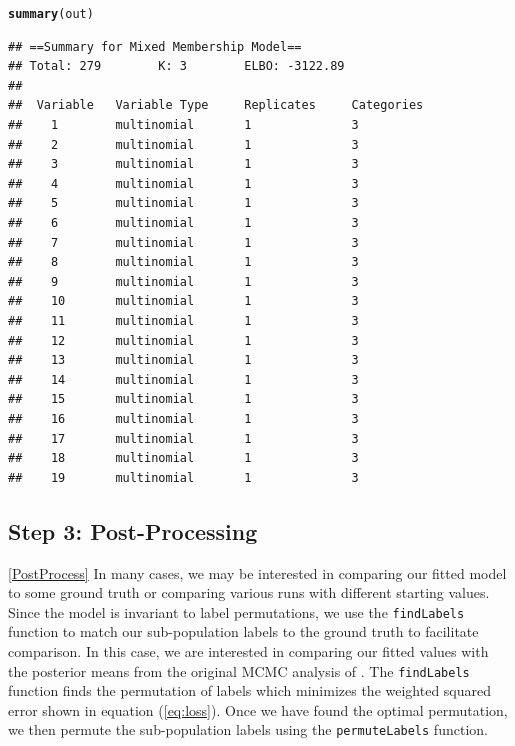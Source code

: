 \documentclass{article}\usepackage[]{graphicx}\usepackage[]{color}
\makeatletter
\newcommand{\hlstd}[1]{\textcolor[rgb]{0.345,0.345,0.345}{#1}}%
\newcommand{\hlkwd}[1]{\textcolor[rgb]{0.737,0.353,0.396}{\textbf{#1}}}%
\newenvironment{kframe}{%
 \def\at@end@of@kframe{}%
 \ifinner\ifhmode%
  \def\at@end@of@kframe{\end{minipage}}%
  \begin{minipage}{\columnwidth}%
 \fi\fi%
 \def\FrameCommand##1{\hskip\@totalleftmargin \hskip-\fboxsep
 \colorbox{shadecolor}{##1}\hskip-\fboxsep
     \hskip-\linewidth \hskip-\@totalleftmargin \hskip\columnwidth}%
 \MakeFramed {\advance\hsize-\width
   \@totalleftmargin\z@ \linewidth\hsize
   \@setminipage}}%
 {\par\unskip\endMakeFramed%
 \at@end@of@kframe}
\newenvironment{knitrout}{}{} %
\renewenvironment{knitrout}{\begin{singlespace}}{\end{singlespace}}
\makeatother
\begin{document}
\begin{knitrout}
\color{fgcolor}\begin{kframe}
\begin{alltt}
\hlkwd{summary}\hlstd{(out)}
\end{alltt}
\begin{verbatim}
## ==Summary for Mixed Membership Model==
## Total: 279		 K: 3		 ELBO: -3122.89
## 
##  Variable   Variable Type     Replicates     Categories  
##    1        multinomial       1              3           
##    2        multinomial       1              3           
##    3        multinomial       1              3           
##    4        multinomial       1              3           
##    5        multinomial       1              3           
##    6        multinomial       1              3           
##    7        multinomial       1              3           
##    8        multinomial       1              3           
##    9        multinomial       1              3           
##    10       multinomial       1              3           
##    11       multinomial       1              3           
##    12       multinomial       1              3           
##    13       multinomial       1              3           
##    14       multinomial       1              3           
##    15       multinomial       1              3           
##    16       multinomial       1              3           
##    17       multinomial       1              3           
##    18       multinomial       1              3           
##    19       multinomial       1              3
\end{verbatim}
\end{kframe}
\end{knitrout}

\subsection*{Step 3: Post-Processing}\ref{PostProcess}
In many cases, we may be interested in comparing our fitted model to some ground truth or comparing various runs with different starting values. Since the model is invariant to label permutations, we use the \texttt{findLabels} function to match our sub-population labels to the ground truth to facilitate comparison. In this case, we are interested in comparing our fitted values with the posterior means from the original MCMC analysis of \cite{grossManriqueVallier}. The \texttt{findLabels} function finds the permutation of labels which minimizes the weighted squared error shown in equation (\ref{eq:loss}). Once we have found the optimal permutation, we then permute the sub-population labels using the \texttt{permuteLabels} function. 
\end{document}
